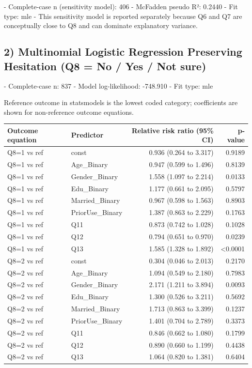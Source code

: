 \documentclass[12pt,a4paper]{article}
\begin{document}
- Complete-case n (sensitivity model): 406 - McFadden pseudo R²: 0.2440 - Fit type: mle - This sensitivity model is reported separately because Q6 and Q7 are conceptually close to Q8 and can dominate explanatory variance.

\subsection*{2) Multinomial Logistic Regression Preserving Hesitation (Q8 = No / Yes / Not sure)}
- Complete-case n: 837 - Model log-likelihood: -748.910 - Fit type: mle

Reference outcome in statsmodels is the lowest coded category; coefficients are shown for non-reference outcome equations.

\begin{center}
\small
\begin{tabular}{llrr}
\hline
\textbf{Outcome equation} & \textbf{Predictor} & \textbf{Relative risk ratio (95\% CI)} & \textbf{p-value} \\
\hline
Q8=1 vs ref & const & 0.936 (0.264 to 3.317) & 0.9189 \\
Q8=1 vs ref & Age\_Binary & 0.947 (0.599 to 1.496) & 0.8139 \\
Q8=1 vs ref & Gender\_Binary & 1.558 (1.097 to 2.214) & 0.0133 \\
Q8=1 vs ref & Edu\_Binary & 1.177 (0.661 to 2.095) & 0.5797 \\
Q8=1 vs ref & Married\_Binary & 0.967 (0.598 to 1.563) & 0.8903 \\
Q8=1 vs ref & PriorUse\_Binary & 1.387 (0.863 to 2.229) & 0.1763 \\
Q8=1 vs ref & Q11 & 0.873 (0.742 to 1.028) & 0.1028 \\
Q8=1 vs ref & Q12 & 0.794 (0.651 to 0.970) & 0.0239 \\
Q8=1 vs ref & Q13 & 1.585 (1.328 to 1.892) & <0.0001 \\
Q8=2 vs ref & const & 0.304 (0.046 to 2.013) & 0.2170 \\
Q8=2 vs ref & Age\_Binary & 1.094 (0.549 to 2.180) & 0.7983 \\
Q8=2 vs ref & Gender\_Binary & 2.171 (1.211 to 3.894) & 0.0093 \\
Q8=2 vs ref & Edu\_Binary & 1.300 (0.526 to 3.211) & 0.5692 \\
Q8=2 vs ref & Married\_Binary & 1.713 (0.863 to 3.399) & 0.1237 \\
Q8=2 vs ref & PriorUse\_Binary & 1.401 (0.704 to 2.789) & 0.3373 \\
Q8=2 vs ref & Q11 & 0.846 (0.662 to 1.080) & 0.1799 \\
Q8=2 vs ref & Q12 & 0.890 (0.660 to 1.199) & 0.4438 \\
Q8=2 vs ref & Q13 & 1.064 (0.820 to 1.381) & 0.6404 \\
\hline
\end{tabular}
\end{center}
\end{document}
